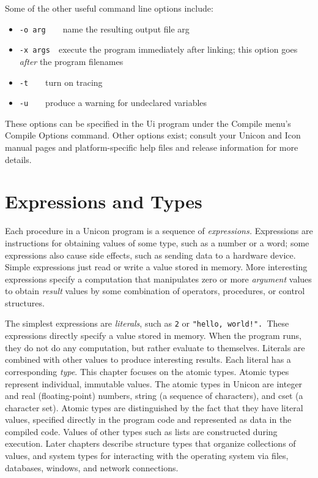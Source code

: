 Some of the other useful command line options include:

\begin{itemize}
\item \texttt{{}-o arg}\ \ \ \ name the resulting output file arg
\item \texttt{{}-x args}\ \ execute the program immediately after linking;
		 this option goes \textit{after} the program filenames
\item \texttt{{}-t}\ \ \ \ turn on tracing
\item \texttt{{}-u}\ \ \ \ produce a warning for undeclared variables
\end{itemize}

These options can be specified in the Ui program under the Compile
menu's Compile Options command. Other options exist;
consult your Unicon and Icon manual pages and platform-specific help
files and release information for more details.

\section{Expressions and Types}

Each procedure in a Unicon program is a sequence of
\textit{expression}\textit{s.} Expressions are
instructions for obtaining values of some
type, such as a number or a word; some expressions also
cause side effects, such as sending data to a hardware device.
Simple expressions just read or write a value stored in
memory. More interesting expressions specify a computation that
manipulates zero or more \textit{argument} values to
obtain \textit{result} values by some combination of
operators, procedures, or control structures.

The simplest expressions are \textit{literal}\textit{s},
such as \texttt{2} or \texttt{"hello,
world!"}\texttt{. }These expressions directly specify a
value stored in memory. When the program runs, they do not do any
computation, but rather evaluate to themselves. Literals are combined
with other values to produce interesting results. Each literal has a
corresponding \textit{type}. This chapter focuses on the atomic types. Atomic types represent individual, immutable values. The atomic types in Unicon are
integer and real (floating-point)
numbers, string (a sequence of characters), and
cset (a character set). Atomic types
are distinguished by the fact that they have literal values, specified
directly in the program code and represented as data in the compiled
code. Values of other types such as lists are constructed during
execution. Later chapters describe structure types that organize
collections of values, and system types for interacting with the
operating system via files, databases, windows, and network
connections. 

